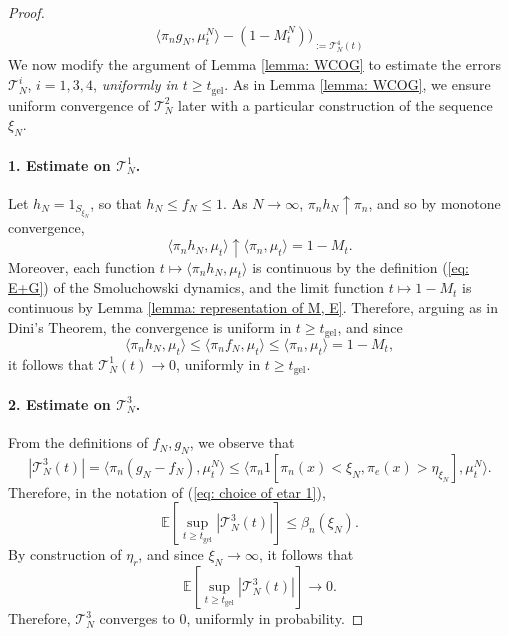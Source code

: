 \begin{proof}
\begin{equation}
\begin{split}
{   \langle \pi_n g_N, \mu^N_t\rangle - (1-M^N_t))}_{:=\mathcal{T}^4_N(t)}\end{split} \end{equation} We now modify the argument of Lemma \ref{lemma: WCOG} to estimate the errors $\mathcal{T}^i_N$, $i=1,3,4$, \emph{uniformly in $t\ge t_\mathrm{gel}$}.  As in Lemma \ref{lemma: WCOG}, we ensure uniform convergence of $\mathcal{T}^2_N$ later with a particular construction of the sequence $\xi_N$. \paragraph{1. Estimate on $\mathcal{T}^1_N$.} Let $h_N=1_{S_{\xi_N}}$, so that $h_N \le f_N \le 1$. As $N\rightarrow \infty$, $\pi_n h_N \uparrow \pi_n$, and so by monotone convergence, \begin{equation}
       \langle \pi_n h_N, \mu_t\rangle \uparrow \langle \pi_n, \mu_t\rangle =1-M_t.
   \end{equation} Moreover, each function $t\mapsto \langle \pi_n h_N, \mu_t\rangle$ is continuous by the definition (\ref{eq: E+G}) of the Smoluchowski dynamics, and the limit function $t\mapsto 1-M_t$ is continuous by Lemma \ref{lemma: representation of M, E}. Therefore, arguing as in Dini's Theorem, the convergence is uniform in $t\geq t_\text{gel}$, and since \begin{equation}
       \langle \pi_n h_N, \mu_t\rangle \le \langle \pi_n f_N, \mu_t \rangle \le \langle \pi_n, \mu_t\rangle = 1-M_t, 
   \end{equation} it follows that $\mathcal{T}^1_N(t) \rightarrow 0$, uniformly in $t\geq t_\text{gel}$.
   \paragraph{2. Estimate on $\mathcal{T}^3_N$.} From the definitions of $f_N, g_N$, we observe that \begin{equation}
       |\mathcal{T}^3_N(t)|=\langle \pi_n(g_N-f_N), \mu^N_t\rangle \le  \langle \pi_n 1[\pi_n(x)<\xi_N, \pi_e(x)>\eta_{\xi_N}], \mu^N_t\rangle.
   \end{equation} Therefore, in the notation of (\ref{eq: choice of etar 1}), \begin{equation}
       \mathbb{E}\left[\sup_{t\geq t_\text{gel}} |\mathcal{T}^3_N(t)|\right] \leq \beta_n(\xi_N).
   \end{equation} By construction of $\eta_r$, and since $\xi_N \rightarrow \infty$, it follows that \begin{equation}
       \mathbb{E}\left[\sup_{t\geq t_\text{gel}} |\mathcal{T}^3_N(t)|\right] \rightarrow 0.\end{equation} Therefore, $\mathcal{T}^3_N$ converges to $0$, uniformly in probability.

\end{proof}

